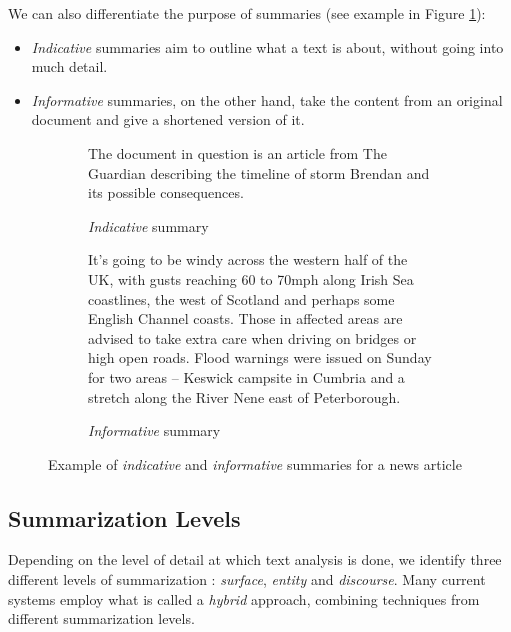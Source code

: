 \noindent
We can also differentiate the purpose of summaries \cite{radev_introduction_2002} (see example in Figure \ref{fig:indicative_informative_summaries}):

\begin{itemize}
\item \textit{Indicative} summaries aim to outline what a text is about, without going into much detail.
\item \textit{Informative} summaries, on the other hand, take the content from an original document and give a shortened version of it.
\end{itemize}

\begin{figure}[H]
\begin{subfigure}{\textwidth}
\begin{displayquote}
The document in question is an article from The Guardian describing the timeline of storm Brendan and its possible consequences.
\end{displayquote}
\caption{\textit{Indicative} summary}
\vspace{\baselineskip}
\end{subfigure}
\begin{subfigure}{\textwidth}
\begin{displayquote}
It’s going to be windy across the western half of the UK, with gusts reaching 60 to 70mph along Irish Sea coastlines, the west of Scotland and perhaps some English Channel coasts. Those in affected areas are advised to take extra care when driving on bridges or high open roads. Flood warnings were issued on Sunday for two areas – Keswick campsite in Cumbria and a stretch along the River Nene east of Peterborough.
\end{displayquote}
\caption{\textit{Informative} summary}
\end{subfigure}
\caption[]{Example of \textit{indicative} and \textit{informative} summaries for a news article\footnotemark}
\label{fig:indicative_informative_summaries}
\end{figure}


\subsection{Summarization Levels}

Depending on the level of detail at which text analysis is done, we identify three different levels of summarization \cite{lloret_text_2008}: \textit{surface}, \textit{entity} and \textit{discourse}. Many current systems employ what is called a \textit{hybrid} approach, combining techniques from different summarization levels.


